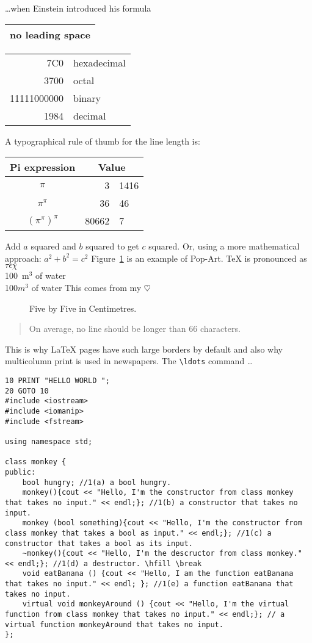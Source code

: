 \documentclass[a4paper,11pt]{article}
\begin{document}
\ldots when Einstein introduced his formula \begin{tabular}{@{} l @{}}
\hline
no leading space\\
\hline
\end{tabular}
\begin{tabular}{|r|l|}
\hline
7C0 & hexadecimal \\
3700 & octal \\ \cline{2-2}
11111000000 & binary \\
\hline \hline
1984 & decimal \\
\hline
\end{tabular}
A typographical rule of thumb
for the line length is:
\begin{tabular}{c r @{.} l}
Pi expression &
\multicolumn{2}{c}{Value} \\
\hline
$\pi$ & 3&1416 \\
$\pi^{\pi}$ & 36&46 \\
$(\pi^{\pi})^{\pi}$ & 80662&7 \\
\end{tabular}
Add $a$ squared and $b$ squared
to get $c$ squared. Or, using
a more mathematical approach:
$a^2 + b^2 = c^2$
Figure~\ref{white} is an example of Pop-Art.
\TeX{} is pronounced as
$\tau\epsilon\chi$\\[5pt]
100~m$^{3}$ of water\\[5pt]
100$ m^3$ of water 
This comes from my $\heartsuit$
\begin{figure}[!hbtp]
\makebox[\textwidth]{\framebox[5cm]{\rule{0pt}{5cm}}}
\caption{Five by Five in Centimetres.\label{white}}
\end{figure}


\begin{quote}
On average, no line should
be longer than 66 characters.
\end{quote}
This is why \LaTeX{} pages have
such large borders by default
and also why multicolumn print
is used in newspapers.
The \verb|\ldots| command \ldots
\begin{verbatim}
10 PRINT "HELLO WORLD ";
20 GOTO 10
#include <iostream>
#include <iomanip>
#include <fstream>

using namespace std;

class monkey {
public:
    bool hungry; //1(a) a bool hungry.
    monkey(){cout << "Hello, I'm the constructor from class monkey that takes no input." << endl;}; //1(b) a constructor that takes no input. 
    monkey (bool something){cout << "Hello, I'm the constructor from class monkey that takes a bool as input." << endl;}; //1(c) a constructor that takes a bool as its input.
    ~monkey(){cout << "Hello, I'm the descructor from class monkey." << endl;}; //1(d) a destructor. \hfill \break
    void eatBanana () {cout << "Hello, I am the function eatBanana that takes no input." << endl; }; //1(e) a function eatBanana that takes no input.
    virtual void monkeyAround () {cout << "Hello, I'm the virtual function from class monkey that takes no input." << endl;}; // a virtual function monkeyAround that takes no input.
};
\end{verbatim}
\end{document}
